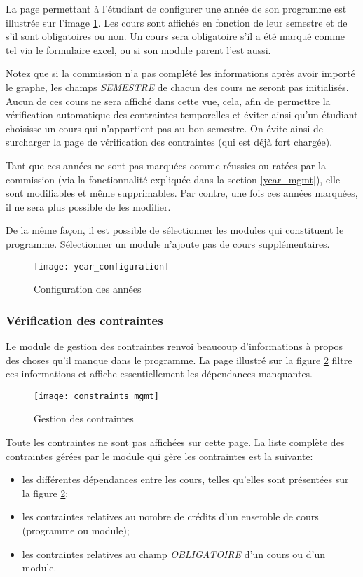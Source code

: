 La page permettant à l'étudiant de configurer une année de son programme est illustrée sur l'image \ref{fig:year_configuration}. Les cours sont affichés en fonction de leur semestre et de s'il sont obligatoires ou non. Un cours sera obligatoire s'il a été marqué comme tel via le formulaire excel, ou si son module parent l'est aussi.

Notez que si la commission n'a pas complété les informations après avoir importé le graphe, les champs \textit{SEMESTRE} de chacun des cours ne seront pas initialisés. Aucun de ces cours ne sera affiché dans cette vue, cela, afin de permettre la vérification automatique des contraintes temporelles et éviter ainsi qu'un étudiant choisisse un cours qui n'appartient pas au bon semestre. On évite ainsi de surcharger la page de vérification des contraintes (qui est déjà fort chargée).

Tant que ces années ne sont pas marquées comme réussies ou ratées par la commission (via la fonctionnalité expliquée dans la section \ref{year_mgmt}), elle sont modifiables et même supprimables. Par contre, une fois ces années marquées, il ne sera plus possible de les modifier. 

De la même façon, il est possible de sélectionner les modules qui constituent le programme. Sélectionner un module n'ajoute pas de cours supplémentaires.
\begin{figure}
\centering
\caption{Configuration des années}
\label{fig:year_configuration}
\texttt{[image: year\_configuration]}
\end{figure}

\subsubsection{Vérification des contraintes}
Le module de gestion des contraintes renvoi beaucoup d'informations à propos des choses qu'il manque dans le programme. La page illustré sur la figure \ref{fig:constraint_mgmt} filtre ces informations et affiche essentiellement les dépendances manquantes.

\begin{figure}
\centering
\caption{Gestion des contraintes}
\label{fig:constraint_mgmt}
\texttt{[image: constraints\_mgmt]}
\end{figure} 

Toute les contraintes ne sont pas affichées sur cette page. La liste complète des contraintes gérées par le module qui gère les contraintes est la suivante:
\begin{itemize}
  \item les différentes dépendances entre les cours, telles qu'elles sont présentées sur la figure \ref{fig:constraint_mgmt};
  \item les contraintes relatives au nombre de crédits d'un ensemble de cours (programme ou module);
  \item les contraintes relatives au champ \textit{OBLIGATOIRE} d'un cours ou d'un module.
\end{itemize}

